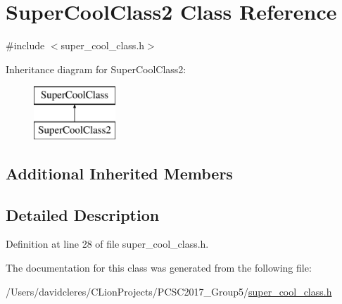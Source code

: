 \hypertarget{class_super_cool_class2}{}\section{Super\+Cool\+Class2 Class Reference}
\label{class_super_cool_class2}


{\ttfamily \#include $<$super\+\_\+cool\+\_\+class.\+h$>$}

Inheritance diagram for Super\+Cool\+Class2\+:\begin{figure}[H]
\begin{center}
\leavevmode
\includegraphics[height=2.000000cm]{class_super_cool_class2}
\end{center}
\end{figure}
\subsection*{Additional Inherited Members}


\subsection{Detailed Description}


Definition at line 28 of file super\+\_\+cool\+\_\+class.\+h.



The documentation for this class was generated from the following file\+:\begin{DoxyCompactItemize}
\item 
/\+Users/davidcleres/\+C\+Lion\+Projects/\+P\+C\+S\+C2017\+\_\+\+Group5/\mbox{\hyperlink{super__cool__class_8h}{super\+\_\+cool\+\_\+class.\+h}}\end{DoxyCompactItemize}
